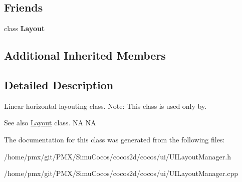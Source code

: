 \subsection*{Friends}
\begin{DoxyCompactItemize}
\item 
\mbox{\label{classui_1_1LinearHorizontalLayoutManager_a1b7da28ed84c0763e8f92cde2df4799b}} 
class {\bfseries Layout}
\end{DoxyCompactItemize}
\subsection*{Additional Inherited Members}


\subsection{Detailed Description}
Linear horizontal layouting class. Note\+: This class is used only by. 

\begin{DoxySeeAlso}{See also}
{\ttfamily \hyperlink{classui_1_1Layout}{Layout}} class.  NA  NA 
\end{DoxySeeAlso}


The documentation for this class was generated from the following files\+:\begin{DoxyCompactItemize}
\item 
/home/pmx/git/\+P\+M\+X/\+Simu\+Cocos/cocos2d/cocos/ui/U\+I\+Layout\+Manager.\+h\item 
/home/pmx/git/\+P\+M\+X/\+Simu\+Cocos/cocos2d/cocos/ui/U\+I\+Layout\+Manager.\+cpp\end{DoxyCompactItemize}
